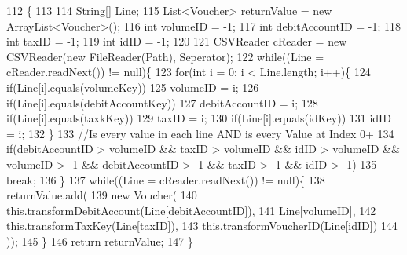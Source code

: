 \begin{DoxyCode}
112                                                                                                            
                                                                  \{
113         
114         String[] Line;
115         List<Voucher> returnValue = \textcolor{keyword}{new} ArrayList<Voucher>();
116         \textcolor{keywordtype}{int} volumeID = -1;
117         \textcolor{keywordtype}{int} debitAccountID = -1;
118         \textcolor{keywordtype}{int} taxID = -1;
119         \textcolor{keywordtype}{int} idID = -1;
120         
121         CSVReader cReader = \textcolor{keyword}{new} CSVReader(\textcolor{keyword}{new} FileReader(Path), Seperator);
122         \textcolor{keywordflow}{while}((Line = cReader.readNext()) != null)\{
123             \textcolor{keywordflow}{for}(\textcolor{keywordtype}{int} i = 0; i < Line.length; i++)\{
124                 \textcolor{keywordflow}{if}(Line[i].equals(volumeKey))
125                     volumeID = i;
126                 \textcolor{keywordflow}{if}(Line[i].equals(debitAccountKey))
127                     debitAccountID = i;
128                 \textcolor{keywordflow}{if}(Line[i].equals(taxkKey))
129                     taxID = i;
130                 \textcolor{keywordflow}{if}(Line[i].equals(idKey))
131                     idID = i;
132             \}
133             \textcolor{comment}{//Is every value in each line AND is every Value at Index 0+}
134             \textcolor{keywordflow}{if}(debitAccountID > volumeID && taxID > volumeID && idID > volumeID && volumeID > -1 && 
      debitAccountID > -1 && taxID > -1 && idID > -1)
135                 \textcolor{keywordflow}{break};
136         \}
137         \textcolor{keywordflow}{while}((Line = cReader.readNext()) != null)\{
138             returnValue.add(
139                     \textcolor{keyword}{new} Voucher( 
140                             this.transformDebitAccount(Line[debitAccountID]), 
141                             Line[volumeID], 
142                             this.transformTaxKey(Line[taxID]), 
143                             this.transformVoucherID(Line[idID])
144                                     ));
145         \}
146         \textcolor{keywordflow}{return} returnValue;
147     \}
\end{DoxyCode}
